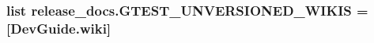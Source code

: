 \subsubsection[{\texorpdfstring{G\+T\+E\+S\+T\+\_\+\+U\+N\+V\+E\+R\+S\+I\+O\+N\+E\+D\+\_\+\+W\+I\+K\+IS}{GTEST_UNVERSIONED_WIKIS}}]{\setlength{\rightskip}{0pt plus 5cm}list release\+\_\+docs.\+G\+T\+E\+S\+T\+\_\+\+U\+N\+V\+E\+R\+S\+I\+O\+N\+E\+D\+\_\+\+W\+I\+K\+IS = \mbox{[}\textquotesingle{}Dev\+Guide.\+wiki\textquotesingle{}\mbox{]}}\hypertarget{namespacerelease__docs_aaeabb8c74d9db7a4b2f3c66e8f1a04ee}{}\label{namespacerelease__docs_aaeabb8c74d9db7a4b2f3c66e8f1a04ee}
